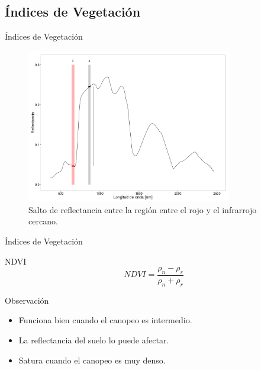 \documentclass[handout]{beamer}
\begin{document}
\subsection{\'Indices de Vegetaci\'on}

\begin{frame}{\'Indices de Vegetaci\'on}
    \begin{figure}
    \centering
    \includegraphics[width=0.8\textwidth]{imagenes/salto_nr.png}
    \caption{Salto de reflectancia entre la regi\'on entre el rojo y el infrarrojo cercano.}
    \end{figure}
\end{frame}
\begin{frame}{\'Indices de Vegetaci\'on}
  \begin{block}{NDVI}
      \begin{equation}
          NDVI = \frac{\rho_n-\rho_r}{\rho_n+\rho_r} 
      \end{equation}
  \end{block}\pause
    \begin{block}{Observaci\'on}
        \begin{itemize}[<+->]
            \item Funciona bien cuando el canopeo es intermedio.
            \item La reflectancia del suelo lo puede afectar.
            \item Satura cuando el canopeo es muy denso.
        \end{itemize}
    \end{block}
\end{frame}
\end{document}
